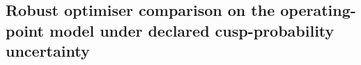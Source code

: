 %
%
\subsection{Robust optimiser comparison on the operating-point model under declared cusp-probability uncertainty}
\label{sec:mdo-l0-v1}

